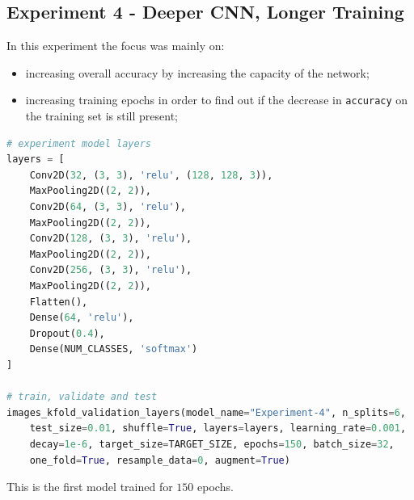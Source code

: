\documentclass[11pt,a4paper]{article}
\begin{document}
\subsection{Experiment 4 - Deeper CNN, Longer Training}
In this experiment the focus was mainly on:
\begin{itemize}
    \item increasing overall accuracy by increasing the capacity of the network;
    \item increasing training epochs in order to find out if the decrease in \texttt{accuracy} on the training set is still present;
\end{itemize}
\begin{lstlisting}[language=Python,frame=single]
# experiment model layers
layers = [
    Conv2D(32, (3, 3), 'relu', (128, 128, 3)),
    MaxPooling2D((2, 2)),
    Conv2D(64, (3, 3), 'relu'),
    MaxPooling2D((2, 2)),
    Conv2D(128, (3, 3), 'relu'),
    MaxPooling2D((2, 2)),
    Conv2D(256, (3, 3), 'relu'),
    MaxPooling2D((2, 2)),
    Flatten(),
    Dense(64, 'relu'),
    Dropout(0.4),
    Dense(NUM_CLASSES, 'softmax')
]

# train, validate and test
images_kfold_validation_layers(model_name="Experiment-4", n_splits=6,
    test_size=0.01, shuffle=True, layers=layers, learning_rate=0.001,
    decay=1e-6, target_size=TARGET_SIZE, epochs=150, batch_size=32,
    one_fold=True, resample_data=0, augment=True)
\end{lstlisting}
This is the first model trained for $150$ epochs.
\end{document}

